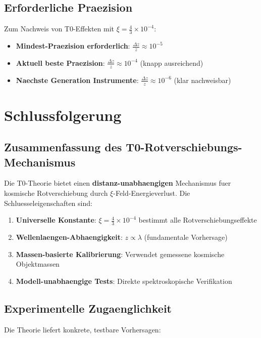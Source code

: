 \documentclass[12pt,a4paper]{article}
\newcommand{\xiconst}{\xi = \frac{4}{3} \times 10^{-4}}
\theoremstyle{definition}
\begin{document}
	\subsection{Erforderliche Praezision}
	
	Zum Nachweis von T0-Effekten mit $\xiconst$:
	
	\begin{itemize}
		\item \textbf{Mindest-Praezision erforderlich}: $\frac{\Delta z}{z} \approx 10^{-5}$
		\item \textbf{Aktuell beste Praezision}: $\frac{\Delta z}{z} \approx 10^{-4}$ (knapp ausreichend)
		\item \textbf{Naechste Generation Instrumente}: $\frac{\Delta z}{z} \approx 10^{-6}$ (klar nachweisbar)
	\end{itemize}
	
	\section{Schlussfolgerung}
	
	\subsection{Zusammenfassung des T0-Rotverschiebungs-Mechanismus}
	
	Die T0-Theorie bietet einen \textbf{distanz-unabhaengigen} Mechanismus fuer kosmische Rotverschiebung durch $\xi$-Feld-Energieverlust. Die Schluesseleigenschaften sind:
	
	\begin{enumerate}
		\item \textbf{Universelle Konstante}: $\xiconst$ bestimmt alle Rotverschiebungseffekte
		\item \textbf{Wellenlaengen-Abhaengigkeit}: $z \propto \lambda$ (fundamentale Vorhersage)
		\item \textbf{Massen-basierte Kalibrierung}: Verwendet gemessene kosmische Objektmassen
		\item \textbf{Modell-unabhaengige Tests}: Direkte spektroskopische Verifikation
	\end{enumerate}
	
	\subsection{Experimentelle Zugaenglichkeit}
	
	Die Theorie liefert konkrete, testbare Vorhersagen:
	
\end{document}
